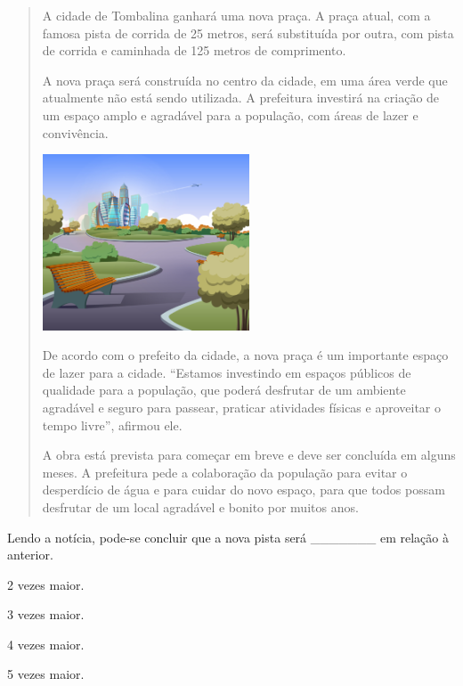 \begin{quote}
A cidade de Tombalina ganhará uma nova praça. A praça atual, com a famosa pista de corrida de 25 metros, será substituída por outra, com pista de corrida e caminhada de 125 metros de comprimento.

A nova praça será construída no centro da cidade, em uma área verde que atualmente não está sendo utilizada. A prefeitura investirá na criação de um espaço amplo e agradável para a população, com áreas de lazer e convivência.

\vspace{1em}
\begin{center}
\includegraphics[width=0.5\textwidth]{./media/image62a.jpeg}
\end{center}
\vspace{1em}

De acordo com o prefeito da cidade, a nova praça é um importante espaço de lazer para a cidade. ``Estamos investindo em espaços públicos de qualidade para a população, que poderá desfrutar de um ambiente agradável e seguro para passear, praticar atividades físicas e aproveitar o tempo livre'', afirmou ele.

A obra está prevista para começar em breve e deve ser concluída em alguns meses. A prefeitura pede a colaboração da população para evitar o desperdício de água e para cuidar do novo espaço, para que todos possam desfrutar de um local agradável e bonito por muitos anos.

\end{quote}

Lendo a notícia, pode-se concluir que a nova pista será \_\_\_\_\_\_\_ em relação à anterior.

\begin{escolha}
\begin{multicols}{2}
\item
  2 vezes maior.
\item
  3 vezes maior.
\item
  4 vezes maior.
\item
  5 vezes maior.
  \end{multicols}
\end{escolha}

